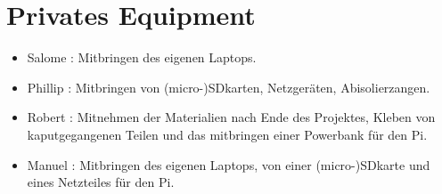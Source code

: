 \documentclass{article}
\begin{document}
\section{Privates Equipment}

\begin{itemize}

\item Salome : Mitbringen des eigenen Laptops.

\item Phillip : Mitbringen von (micro-)SDkarten, Netzgeräten, Abisolierzangen.

\item Robert : Mitnehmen der Materialien nach Ende des Projektes, Kleben von kaputgegangenen Teilen und das mitbringen einer Powerbank für den Pi. 

\item Manuel : Mitbringen des eigenen Laptops, von einer (micro-)SDkarte und eines Netzteiles für den Pi.

\end{itemize}
\end{document}
